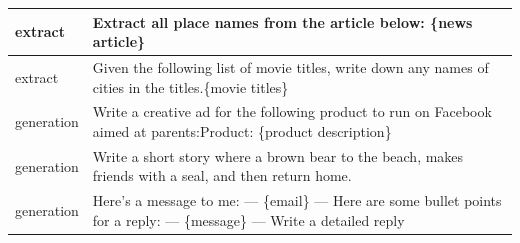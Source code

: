 \documentclass{article}
\begin{document}
\begin{longtable}{p{} p{}}
       extract &                                                                                                                                                                                                                                                                                                                                                        Extract all place names from the article below:{\newline} {\newline}{\newline} \{news article\} \\ \midrule
       extract &                                                                                                                                                                                                                                                                                                                    Given the following list of movie titles, write down any names of cities in the titles.{\newline}{\newline}\{movie titles\} \\ \midrule
    generation &                                                                                                                                                                                                                                                                                                         Write a creative ad for the following product to run on Facebook aimed at parents:{\newline}{\newline}Product: \{product description\} \\ \midrule
    generation &                                                                                                                                                                                                                                                                                                                        Write a short story where a brown bear to the beach, makes friends with a seal, and then return home. \\ \midrule
    generation &                                                                                                                                                                                                                                                                          Here's a message to me:{\newline} ---{\newline} \{email\}{\newline} ---{\newline} {\newline}{\newline} Here are some bullet points for a reply:{\newline} ---{\newline} \{message\}{\newline} ---{\newline} {\newline}{\newline} Write a detailed reply \\ \midrule

\end{longtable}
\end{document}
